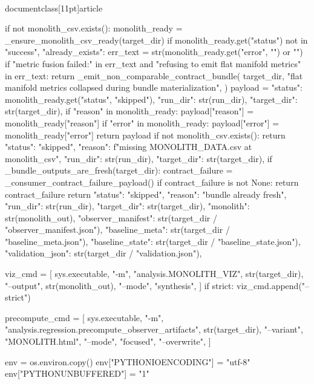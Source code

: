 \\documentclass[11pt]{article}
\begin{document}
\begin{CodeBlock}
    if not monolith_csv.exists():
        monolith_ready = _ensure_monolith_csv_ready(target_dir)
        if monolith_ready.get("status") not in {"success", "already_exists"}:
            err_text = str(monolith_ready.get("error", "") or "")
            if "metric fusion failed:" in err_text and "refusing to emit flat manifold metrics" in err_text:
                return _emit_non_comparable_contract_bundle(
                    target_dir,
                    "flat manifold metrics collapsed during bundle materialization",
                )
            payload = {
                "status": monolith_ready.get("status", "skipped"),
                "run_dir": str(run_dir),
                "target_dir": str(target_dir),
            }
            if "reason" in monolith_ready:
                payload["reason"] = monolith_ready["reason"]
            if "error" in monolith_ready:
                payload["error"] = monolith_ready["error"]
            return payload
    if not monolith_csv.exists():
        return {
            "status": "skipped",
            "reason": f"missing MONOLITH_DATA.csv at {monolith_csv}",
            "run_dir": str(run_dir),
            "target_dir": str(target_dir),
        }
    if _bundle_outputs_are_fresh(target_dir):
        contract_failure = _consumer_contract_failure_payload()
        if contract_failure is not None:
            return contract_failure
        return {
            "status": "skipped",
            "reason": "bundle already fresh",
            "run_dir": str(run_dir),
            "target_dir": str(target_dir),
            "monolith": str(monolith_out),
            "observer_manifest": str(target_dir / "observer_manifest.json"),
            "baseline_meta": str(target_dir / "baseline_meta.json"),
            "baseline_state": str(target_dir / "baseline_state.json"),
            "validation_json": str(target_dir / "validation.json"),
        }

    viz_cmd = [
        sys.executable,
        "-m",
        "analysis.MONOLITH_VIZ",
        str(target_dir),
        "--output",
        str(monolith_out),
        "--mode",
        "synthesis",
    ]
    if strict:
        viz_cmd.append("--strict")

    precompute_cmd = [
        sys.executable,
        "-m",
        "analysis.regression.precompute_observer_artifacts",
        str(target_dir),
        "--variant",
        "MONOLITH.html",
        "--mode",
        "focused",
        "--overwrite",
    ]

    env = os.environ.copy()
    env["PYTHONIOENCODING"] = "utf-8"
    env["PYTHONUNBUFFERED"] = "1"


\end{CodeBlock}
\end{document}
